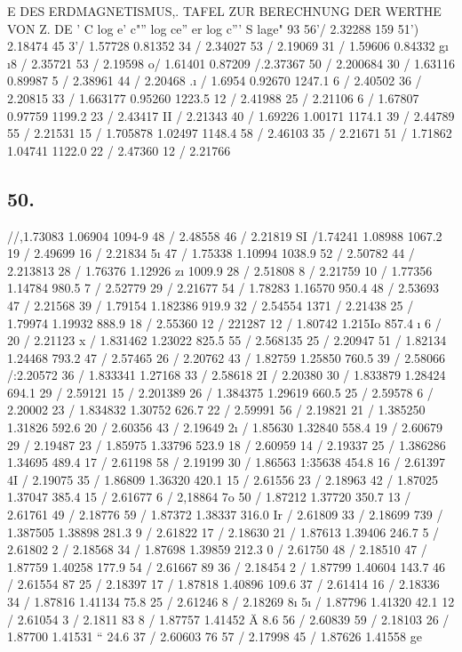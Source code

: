 \documentclass[12pt,a4paper]{article}
\begin{document}
\newpage


E DES ERDMAGNETISMUS,. TAFEL ZUR BERECHNUNG DER WERTHE VON Z. DE \textdegree{} ' C log e' c"'' log ce'' er log c''' S lage" \textregistered{} 93\textdegree{} 56'/ 2.32288 159\textdegree{} 51') 2.18474 45\textdegree{} 3'/ 1.57728 0.81352 34 / 2.34027 53 / 2.19069 31 / 1.59606 0.84332 g\i{} \i{}8 /  2.35721 53 / 2.19598 o/ 1.61401 0.87209 /.2.37367 50 / 2.200684 30 / 1.63116 0.89987 5 / 2.38961 44 / 2.20468 .\i{} / 1.6954 0.92670 1247.1 6 / 2.40502 36 / 2.20815 33 / 1.663177 0.95260 1223.5 12 / 2.41988 25 / 2.21106 6 / 1.67807 0.97759 1199.2 23 / 2.43417 II / 2.21343 40 / 1.69226 1.00171 1174.1 39 / 2.44789 55 / 2.21531 15 / 1.705878 1.02497 1148.4 58 / 2.46103 35 / 2.21671 51 / 1.71862 1.04741 1122.0 22 / 2.47360 12 / 2.21766

\subsection*{50.}
//,1.73083 1.06904 1094-9 48 / 2.48558 46 / 2.21819 SI /1.74241 1.08988 1067.2 19 / 2.49699 16 / 2.21834 5\i{} 47 / 1.75338 1.10994 1038.9 52 / 2.50782 44 / 2.213813 28 / 1.76376 1.12926 z\i{} 1009.9 28 / 2.51808 8 /  2.21759 10 / 1.77356 1.14784 980.5 7 /  2.52779 29 / 2.21677 54 / 1.78283 1.16570 950.4 48 / 2.53693 47 / 2.21568 39 / 1.79154 1.182386 919.9 32 / 2.54554 1371 /  2.21438 25 / 1.79974 1.19932 888.9 18 / 2.55360 12 / 221287 12 / 1.80742 1.215Io 857.4 \i{} 6 /  20 / 2.21123 x / 1.831462 1.23022 825.5 55 / 2.568135 25 / 2.20947 51 / 1.82134 1.24468 793.2 47 / 2.57465 26 / 2.20762 43 / 1.82759 1.25850 760.5 39 / 2.58066 /:2.20572 36 / 1.833341 1.27168 33 / 2.58618 2I / 2.20380 30 / 1.833879 1.28424 694.1 29 / 2.59121 15 / 2.201389 26 / 1.384375 1.29619 660.5 25 / 2.59578 6 / 2.20002 23 / 1.834832 1.30752 626.7 22 / 2.59991 56 / 2.19821 21 / 1.385250 1.31826 592.6 20 / 2.60356 43 / 2.19649 2\i{} / 1.85630 1.32840 558.4 19 / 2.60679 29 / 2.19487 23 / 1.85975 1.33796 523.9 18 / 2.60959 14 / 2.19337 25 / 1.386286 1.34695 489.4 17 / 2.61198 58 / 2.19199 30 / 1.86563 1:35638 454.8 16 / 2.61397 4I / 2.19075 35 / 1.86809 1.36320 420.1 15 / 2.61556 23 / 2.18963 42 / 1.87025 1.37047 385.4 15 / 2.61677 6 / 2,18864 7o 50 / 1.87212 1.37720 350.7 13 / 2.61761 49 / 2.18776 59 / 1.87372 1.38337 316.0 Ir / 2.61809 33 / 2.18699 739 / 1.387505 1.38898 281.3 9 / 2.61822 17 / 2.18630 21 / 1.87613 1.39406 246.7 5 / 2.61802 2 / 2.18568 34 / 1.87698 1.39859 212.3 0 /  2.61750 48 / 2.18510 47 / 1.87759 1.40258 177.9 54 / 2.61667 89 36 / 2.18454 2 / 1.87799 1.40604 143.7 46 / 2.61554 87 25 / 2.18397 17 / 1.87818 1.40896 109.6 37 / 2.61414 16 / 2.18336 34 / 1.87816 1.41134 75.8 25 / 2.61246 8 / 2.18269 8\i{} 5\i{} / 1.87796 1.41320 42.1 12 / 2.61054 3 / 2.1811 83\textdegree{} 8 / 1.87757 1.41452 Ä 8.6 56 / 2.60839 59 / 2.18103 26 / 1.87700 1.41531 `` 24.6 37 / 2.60603 76 57 / 2.17998 45 / 1.87626 1.41558 ge
\end{document}
